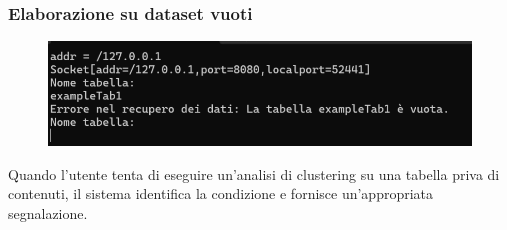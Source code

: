 \subsubsection{Elaborazione su dataset vuoti} 
    \begin{figure}[h!]
        \centering
        \includegraphics[width=\textwidth]{images/dataset_vuoti.png}
    \end{figure}

Quando l'utente tenta di eseguire un'analisi di clustering su una tabella priva di contenuti, il sistema identifica la condizione e fornisce un'appropriata segnalazione.

